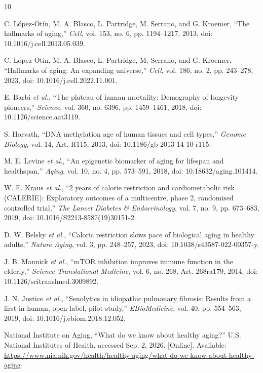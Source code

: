 \documentclass[10pt,conference]{IEEEtran}
\begin{document}
\begin{thebibliography}{10}

C. L\'opez-Ot\'in, M. A. Blasco, L. Partridge, M. Serrano, and G. Kroemer, ``The hallmarks of aging,'' \emph{Cell}, vol. 153, no. 6, pp. 1194--1217, 2013, doi: 10.1016/j.cell.2013.05.039.

C. L\'opez-Ot\'in, M. A. Blasco, L. Partridge, M. Serrano, and G. Kroemer, ``Hallmarks of aging: An expanding universe,'' \emph{Cell}, vol. 186, no. 2, pp. 243--278, 2023, doi: 10.1016/j.cell.2022.11.001.

E. Barbi \emph{et al.}, ``The plateau of human mortality: Demography of longevity pioneers,'' \emph{Science}, vol. 360, no. 6396, pp. 1459--1461, 2018, doi: 10.1126/science.aat3119.

S. Horvath, ``DNA methylation age of human tissues and cell types,'' \emph{Genome Biology}, vol. 14, Art. R115, 2013, doi: 10.1186/gb-2013-14-10-r115.

M. E. Levine \emph{et al.}, ``An epigenetic biomarker of aging for lifespan and healthspan,'' \emph{Aging}, vol. 10, no. 4, pp. 573--591, 2018, doi: 10.18632/aging.101414.

W. E. Kraus \emph{et al.}, ``2 years of calorie restriction and cardiometabolic risk (CALERIE): Exploratory outcomes of a multicentre, phase 2, randomised controlled trial,'' \emph{The Lancet Diabetes \& Endocrinology}, vol. 7, no. 9, pp. 673--683, 2019, doi: 10.1016/S2213-8587(19)30151-2.

D. W. Belsky \emph{et al.}, ``Caloric restriction slows pace of biological aging in healthy adults,'' \emph{Nature Aging}, vol. 3, pp. 248--257, 2023, doi: 10.1038/s43587-022-00357-y.

J. B. Mannick \emph{et al.}, ``mTOR inhibition improves immune function in the elderly,'' \emph{Science Translational Medicine}, vol. 6, no. 268, Art. 268ra179, 2014, doi: 10.1126/scitranslmed.3009892.

J. N. Justice \emph{et al.}, ``Senolytics in idiopathic pulmonary fibrosis: Results from a first-in-human, open-label, pilot study,'' \emph{EBioMedicine}, vol. 40, pp. 554--563, 2019, doi: 10.1016/j.ebiom.2018.12.052.

National Institute on Aging, ``What do we know about healthy aging?'' U.S. National Institutes of Health, accessed Sep. 2, 2026. [Online]. Available: \url{https://www.nia.nih.gov/health/healthy-aging/what-do-we-know-about-healthy-aging}

\end{thebibliography}
\end{document}
